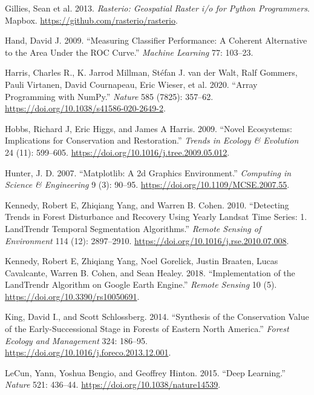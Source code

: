 \documentclass[
  letterpaper,
  DIV=11,
  numbers=noendperiod]{scrartcl}
\newlength{\cslhangindent}
\newlength{\cslentryspacingunit} %
\newenvironment{CSLReferences}[2] %
 {%
  \setlength{\parindent}{0pt}
  \ifodd #1
  \let\oldpar\par
  \def\par{\hangindent=\cslhangindent\oldpar}
  \fi
  \setlength{\parskip}{#2\cslentryspacingunit}
 }%
 {}
\begin{document}
\begin{CSLReferences}{1}{0}
\leavevmode{}%
Gillies, Sean et al. 2013. \emph{Rasterio: Geospatial Raster i/o for
{Python} Programmers}. Mapbox.
\url{https://github.com/rasterio/rasterio}.

\leavevmode{}%
Hand, David J. 2009. {``Measuring Classifier Performance: A Coherent
Alternative to the Area Under the ROC Curve.''} \emph{Machine Learning}
77: 103--23.

\leavevmode{}%
Harris, Charles R., K. Jarrod Millman, Stéfan J. van der Walt, Ralf
Gommers, Pauli Virtanen, David Cournapeau, Eric Wieser, et al. 2020.
{``Array Programming with {NumPy}.''} \emph{Nature} 585 (7825): 357--62.
\url{https://doi.org/10.1038/s41586-020-2649-2}.

\leavevmode{}%
Hobbs, Richard J, Eric Higgs, and James A Harris. 2009. {``Novel
Ecosystems: Implications for Conservation and Restoration.''}
\emph{Trends in Ecology \& Evolution} 24 (11): 599--605.
\url{https://doi.org/10.1016/j.tree.2009.05.012}.

\leavevmode{}%
Hunter, J. D. 2007. {``Matplotlib: A 2d Graphics Environment.''}
\emph{Computing in Science \& Engineering} 9 (3): 90--95.
\url{https://doi.org/10.1109/MCSE.2007.55}.

\leavevmode{}%
Kennedy, Robert E, Zhiqiang Yang, and Warren B. Cohen. 2010.
{``Detecting Trends in Forest Disturbance and Recovery Using Yearly
Landsat Time Series: 1. {LandTrendr} {\textemdash} Temporal Segmentation
Algorithms.''} \emph{Remote Sensing of Environment} 114 (12):
2897--2910. \url{https://doi.org/10.1016/j.rse.2010.07.008}.

\leavevmode{}%
Kennedy, Robert E, Zhiqiang Yang, Noel Gorelick, Justin Braaten, Lucas
Cavalcante, Warren B. Cohen, and Sean Healey. 2018. {``Implementation of
the LandTrendr Algorithm on Google Earth Engine.''} \emph{Remote
Sensing} 10 (5). \url{https://doi.org/10.3390/rs10050691}.

\leavevmode{}%
King, David I., and Scott Schlossberg. 2014. {``Synthesis of the
Conservation Value of the Early-Successional Stage in Forests of Eastern
North America.''} \emph{Forest Ecology and Management} 324: 186--95.
\url{https://doi.org/10.1016/j.foreco.2013.12.001}.

\leavevmode{}%
LeCun, Yann, Yoshua Bengio, and Geoffrey Hinton. 2015. {``Deep
Learning.''} \emph{Nature} 521: 436--44.
\url{https://doi.org/10.1038/nature14539}.


\end{CSLReferences}
\end{document}
